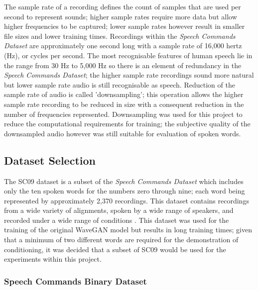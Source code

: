 \documentclass[a4paper, titlepage]{article}
\begin{document}
The sample rate of a recording defines the count of samples that are used per second to represent sounds; higher sample rates require more data but allow higher frequencies to be captured; lower sample rates however result in smaller file sizes and lower training times.
\newline
\newline
Recordings within the \textit{Speech Commands Dataset} are approximately one second long with a sample rate of 16,000 hertz (Hz), or cycles per second.
The most recognisable features of human speech lie in the range from 30 Hz to 5,000 Hz so there is an element of redundancy in the \textit{Speech Commands Dataset}; the higher sample rate recordings sound more natural but lower sample rate audio is still recognisable as speech.
\newline
\newline
Reduction of the sample rate of audio is called 'downsampling'; this operation allows the higher sample rate recording to be reduced in size with a consequent reduction in the number of frequencies represented.
Downsampling was used for this project to reduce the computational requirements for training; the subjective quality of the downsampled audio however was still suitable for evaluation of spoken words.

\subsection{Dataset Selection}

The \ac{SC09} dataset is a subset of the \textit{Speech Commands Dataset} which includes only the ten spoken words for the numbers zero through nine; each word being represented by approximately 2,370 recordings.
This dataset contains recordings from a wide variety of alignments, spoken by a wide range of speakers, and recorded under a wide range of conditions \citep{2018arXiv180204208D}.
\newline
\newline
This dataset was used for the training of the original WaveGAN model but results in long training times; given that a minimum of two different words are required for the demonstration of conditioning, it was decided that a subset of \ac{SC09} would be used for the experiments within this project.

\subsubsection{Speech Commands Binary Dataset}
\end{document}
